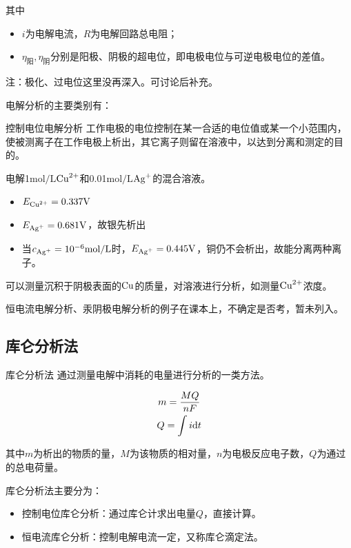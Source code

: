 其中
\begin{itemize}
	\item $i$为电解电流，$R$为电解回路总电阻；
	\item $\eta_{\text{阳}},\eta_{\text{阴}}$分别是阳极、阴极的超电位，即电极电位与可逆电极电位的差值。
\end{itemize}

注：极化、过电位这里没再深入。可讨论后补充。

电解分析的主要类别有：
\begin{definition*}{控制电位电解分析}{}
	工作电极的电位控制在某一合适的电位值或某一个小范围内，使被测离子在工作电极上析出，其它离子则留在溶液中，以达到{\heiti 分离和测定}的目的。
\end{definition*}

\begin{example}
	电解1$\mathrm{mol/L}$$\ce{Cu^2+}$和0.01$\mathrm{mol/L}$$\ce{Ag+}$的混合溶液。
	
	\begin{itemize}
		\item $E_{\ce{Cu^2+}}=0.337\mathrm{V}$
		\item $E_{\ce{Ag+}}=0.681\mathrm{V}$，故银先析出
		\item 当$c_{\ce{Ag+}}=10^{-6}\mathrm{mol/L}$时，$E_{\ce{Ag+}}=0.445\mathrm{V}$，铜仍不会析出，故能分离两种离子。
	\end{itemize}
	
	可以测量沉积于阴极表面的$\ce{Cu}$的质量，对溶液进行分析，如测量$\ce{Cu^2+}$浓度。
\end{example}

恒电流电解分析、汞阴极电解分析的例子在课本上，不确定是否考，暂未列入。

\subsection{库仑分析法}
\begin{definition*}{库仑分析法}{}
	通过测量电解中消耗的电量进行分析的一类方法。
\end{definition*}
	
\begin{gather*}
	m=\dfrac{MQ}{nF}\\
	Q=\int i\mathrm{d}t
\end{gather*}

其中$m$为析出的物质的量，$M$为该物质的相对量，$n$为电极反应电子数，$Q$为通过的总电荷量。

库仑分析法主要分为：

\begin{itemize}
	\item 控制电位库仑分析：通过库仑计求出电量$Q$，直接计算。
	\item 恒电流库仑分析：控制电解电流一定，又称库仑滴定法。
\end{itemize}

